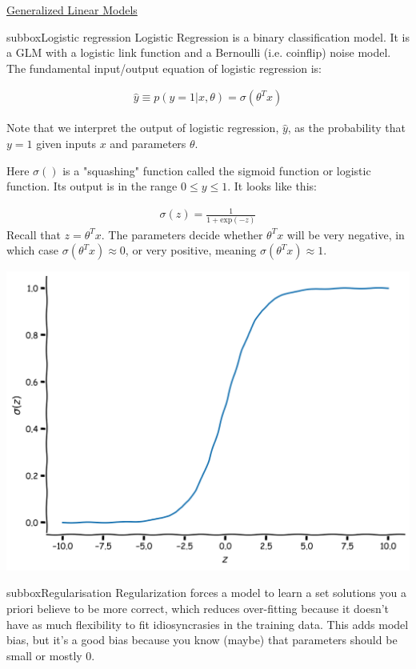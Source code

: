 \begin{textbox}{\href{https://compneuro.neuromatch.io/tutorials/W1D3_GeneralizedLinearModels/student/W1D3_Tutorial2.html}{Generalized Linear Models } }
\begin{subbox}{subbox}{Logistic regression}
\scriptsize
Logistic Regression is a binary classification model. It is a GLM with a logistic link function and a Bernoulli (i.e. coinflip) noise model.
The fundamental input/output equation of logistic regression is:

\begin{align}
\hat{y} \equiv p(y=1|x,\theta) = \sigma(\theta^Tx)
\end{align}

Note that we interpret the output of logistic regression, $\hat{y}$, as the probability that $y = 1$ given inputs $x$ and parameters $\theta$.

Here $\sigma()$ is a "squashing" function called the sigmoid function or logistic function. Its output is in the range $0 \leq y \leq 1$. It looks like this:

\begin{align}
\sigma(z) = \frac{1}{1 + \textrm{exp}(-z)}
\end{align}
Recall that $z = \theta^T x$. The parameters decide whether $\theta^T x$ will be very negative, in which case $\sigma(\theta^T x)\approx 0$, or very positive, meaning  $\sigma(\theta^T x)\approx 1$.

\centering
\includegraphics[scale=0.07]{Figures/GLM/GLMFigure5.png}
\end{subbox}

\begin{subbox}{subbox}{Regularisation 
}
\scriptsize
Regularization forces a model to learn a set solutions you a priori believe to be more correct, which reduces over-fitting because it doesn't have as much flexibility to fit idiosyncrasies in the training data. This adds model bias, but it's a good bias because you know (maybe) that parameters should be small or mostly 0.


\end{subbox}
\end{textbox}
